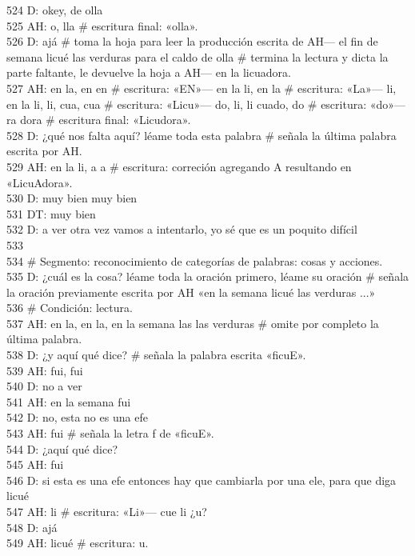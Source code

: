 524 D: okey, de olla\\
525 AH: o, lla \# escritura final: «olla».\\
526 D: ajá \# toma la hoja para leer la producción escrita de AH--- el fin de semana licué las verduras para el caldo de olla \# termina la lectura y dicta la parte faltante, le devuelve la hoja a AH--- en la licuadora.\\
527 AH: en la, en en \# escritura: «EN»--- en la li, en la \# escritura: «La»--- li, en la li, li, cua, cua \# escritura: «Licu»--- do, li, li cuado, do \# escritura: «do»--- ra dora \# escritura final: «Licudora».\\
528 D: ¿qué nos falta aquí? léame toda esta palabra \# señala la última palabra escrita por AH.\\
529 AH: en la li, a a \# escritura: correción agregando A resultando en «LicuAdora».\\
530 D: muy bien muy bien\\
531 DT: muy bien\\
532 D: a ver otra vez vamos a intentarlo, yo sé que es un poquito difícil\\
533 \\
534 \# Segmento: reconocimiento de categorías de palabras: cosas y acciones.\\
535 D: ¿cuál es la cosa? léame toda la oración primero, léame su oración \# señala la oración previamente escrita por AH «en la semana licué las verduras ...» \\
536 \# Condición: lectura.\\
537 AH: en la, en la, en la semana las las verduras \# omite por completo la última palabra.\\
538 D: ¿y aquí qué dice? \# señala la palabra escrita «ficuE».\\
539 AH: fui, fui\\
540 D: no a ver\\
541 AH: en la semana fui\\
542 D: no, esta no es una efe\\
543 AH: fui \# señala la letra f de «ficuE».\\
544 D: ¿aquí qué dice?\\
545 AH: fui\\
546 D: si esta es una efe entonces hay que cambiarla por una ele, para que diga licué\\
547 AH: li \# escritura: «Li»--- cue li ¿u?\\
548 D: ajá\\
549 AH: licué \# escritura: u.\\
